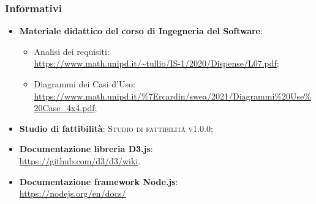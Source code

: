 \documentclass[../analisi-dei-requisiti.tex]{subfiles}
\begin{document}
\subsubsection{Informativi}%
\label{ssub:informativi}
\begin{itemize}
  \item \textbf{Materiale didattico del corso di Ingegneria del Software}:
  \begin{itemize}
    \item Analisi dei requisiti: \\
    \url{https://www.math.unipd.it/~tullio/IS-1/2020/Dispense/L07.pdf};
    \item Diagrammi dei Casi d'Uso: \\
    \url{https://www.math.unipd.it/%7Ercardin/swea/2021/Diagrammi%20Use%20Case_4x4.pdf};
  \end{itemize}
  \item \textbf{Studio di fattibilità}: \textsc{Studio di fattibilità v1.0.0};
  
  \item \textbf{Documentazione libreria D3.js}: \\
  \url{https://github.com/d3/d3/wiki}.

  \item \textbf{Documentazione framework Node.js}: \\
  \url{https://nodejs.org/en/docs/}
\end{itemize}
\end{document}
